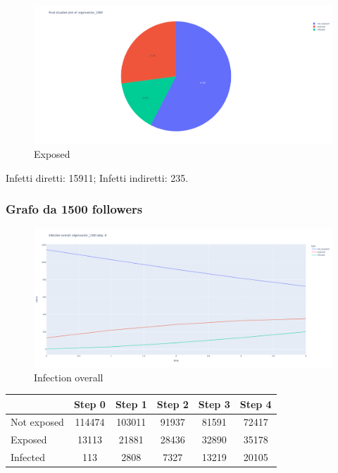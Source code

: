         \begin{figure}[H]
            \includegraphics[width=16cm]{resources/charts/eig_1000_pie.png}
            \caption{Exposed}
            \label{fig:btw_1000_pie}
        \end{figure}
        Infetti diretti: 15911;\newline
        Infetti indiretti: 235.
        
        \subsubsection{Grafo da 1500 followers}
        
        \begin{figure}[H]
                \includegraphics[width=16cm]{resources/charts/eig_1500_line.png}
                \caption{Infection overall}
                \label{fig:eig_1500_line}
        \end{figure}
        
        \begin{table}[H]
            \centering
            \begin{tabular}{|l|c|c|c|c|c|}
            \hline
                        & Step 0 & Step 1 & Step 2 & Step 3 & Step 4 \\ \hline
            Not exposed & 114474 & 103011 & 91937  & 81591  & 72417  \\ \hline
            Exposed     & 13113  & 21881  & 28436  & 32890  & 35178  \\ \hline
            Infected    & 113    & 2808   & 7327   & 13219  & 20105  \\ \hline
            \end{tabular}
        \end{table}
        
